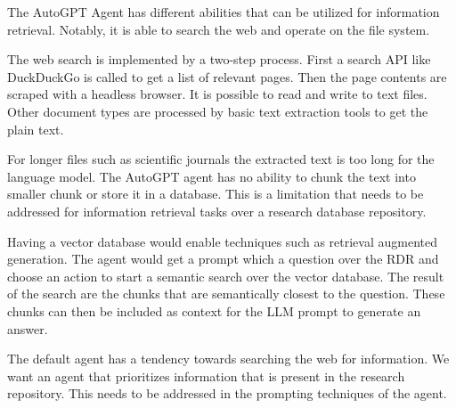 \documentclass[../../main.tex]{subfiles}
\begin{document}
The AutoGPT Agent has different abilities that can be utilized for information retrieval.
Notably, it is able to search the web and operate on the file system.

The web search is implemented by a two-step process.
First a search API like DuckDuckGo is called to get a list of relevant pages.
Then the page contents are scraped with a headless browser.
It is possible to read and write to text files.
Other document types are processed by basic text extraction tools to get the plain text.

For longer files such as scientific journals the extracted text is too long for the language model.
The AutoGPT agent has no ability to chunk the text into smaller chunk or store it in a database.
This is a limitation that needs to be addressed for information retrieval tasks over a research database repository.

Having a vector database would enable techniques such as retrieval augmented generation.
The agent would get a prompt which a question over the RDR and choose an action to start a semantic search over the vector database.
The result of the search are the chunks that are semantically closest to the question.
These chunks can then be included as context for the LLM prompt to generate an answer.

The default agent has a tendency towards searching the web for information. We want an agent that prioritizes information that is present in the research repository.
This needs to be addressed in the prompting techniques of the agent.
\end{document}
